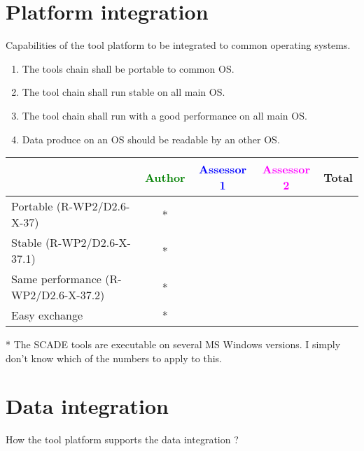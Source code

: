 \section{Platform integration}
Capabilities of the tool platform to  be integrated to common operating systems.
\begin{enumerate}
\item  The tools chain shall be portable to common \gls{OS}.
\item   The tool chain shall run stable on all main \gls{OS}.
\item  The tool chain shall run with a good performance on all main \gls{OS}.
\item  Data produce on an \gls{OS} should be readable by an other \gls{OS}.
\end{enumerate}
\begin{tabular}{|l | c | c | c | c|}
  \hline
  & \textcolor{green}{Author} & \textcolor{blue}{Assessor 1} &  \textcolor{magenta}{Assessor 2} & Total \\
  \hline  Portable (R-WP2/D2.6-X-37) & *
  &                 &                  &\\
  \hline   Stable (R-WP2/D2.6-X-37.1)& *
  &                 &                  &\\
  \hline   Same performance (R-WP2/D2.6-X-37.2)& *
  &                 &                  &\\
  \hline  Easy exchange& *
  &                 &                  &\\
  \hline
\end{tabular}

\begin{author_comment}
* The SCADE tools are executable on several MS Windows versions. I simply don't know which of the numbers to apply to this. 
\end{author_comment}


\section{Data integration}
How the tool platform supports the data integration ?

